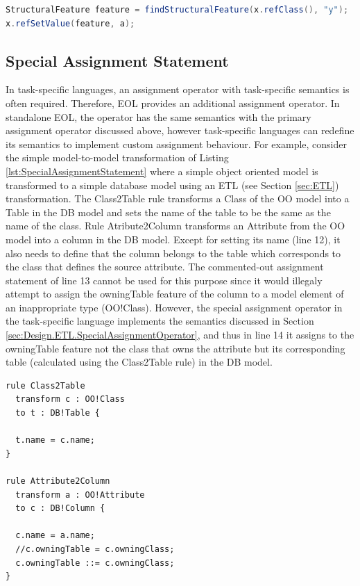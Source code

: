 \begin{lstlisting}[float=tbp, caption=Java code that assigns the value of a property of a model element that belongs to an MDR-based model, label=lst:MdrModelElementPropertyAssignment, language=Java]
StructuralFeature feature = findStructuralFeature(x.refClass(), "y");
x.refSetValue(feature, a);
\end{lstlisting}

\subsection{Special Assignment Statement}
\label{sec:Design.EOL.SpecialAssignmentStatement}
In task-specific languages, an assignment operator with task-specific semantics is often required. Therefore, EOL provides an additional assignment operator. In standalone EOL, the operator has the same semantics with the primary assignment operator discussed above, however task-specific languages can redefine its semantics to implement custom
assignment behaviour. For example, consider the simple model-to-model transformation of Listing \ref{lst:SpecialAssignmentStatement} where a simple object oriented model is transformed to a simple database model using an ETL (see Section \ref{sec:ETL}) transformation. The Class2Table rule transforms a Class of the OO model into
a Table in the DB model and sets the name of the table to be the same as the name of the class. Rule Atribute2Column transforms an Attribute from the OO model into a column in the DB model. Except for setting its name (line 12), it also needs to define that the column belongs to the table which corresponds to the class that defines the source attribute. The commented-out assignment statement of line 13 cannot
be used for this purpose since it would illegaly attempt to assign the owningTable feature of the column to a model element of an inappropriate type (OO!Class). However, the special assignment operator in the task-specific language implements the semantics discussed in Section \ref{sec:Design.ETL.SpecialAssignmentOperator}, and thus in line 14 it assigns to the owningTable feature not the class that owns the attribute but its corresponding table (calculated using the Class2Table rule) in the DB model. 

\begin{lstlisting}[float=tbp, caption=A simple model-to-model transformation
demonstrating the special assignment statement, label=lst:SpecialAssignmentStatement, language=ETL]
rule Class2Table
  transform c : OO!Class
  to t : DB!Table {
  
  t.name = c.name;
}

rule Attribute2Column
  transform a : OO!Attribute
  to c : DB!Column {
  
  c.name = a.name;
  //c.owningTable = c.owningClass;
  c.owningTable ::= c.owningClass;
}

\end{lstlisting}

